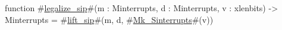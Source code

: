 function #\hyperref[sailRISCVzlegalizzezysip]{legalize\_sip}#(m : Minterrupts, d : Minterrupts, v : xlenbits) -> Minterrupts = {
  #\hyperref[sailRISCVzliftzysip]{lift\_sip}#(m, d, #\hyperref[sailRISCVzMkzySinterrupts]{Mk\_Sinterrupts}#(v))
}
